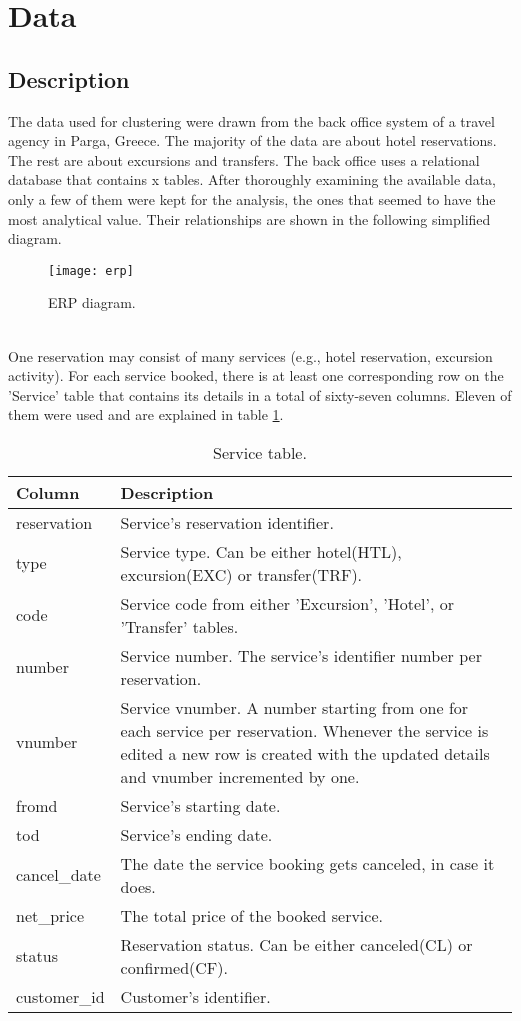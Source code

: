 \section{Data}

\subsection{Description}
The data used for clustering were drawn from the back office system of a travel agency in Parga, Greece. The majority of the data are about hotel reservations. The rest are about excursions and transfers. The back office uses a relational database that contains x tables. After thoroughly examining the available data, only a few of them were kept for the analysis, the ones that seemed to have the most analytical value. Their relationships are shown in the following simplified diagram. \\
\begin{figure}[ht]
\texttt{[image: erp]}
\caption{ERP diagram.}
\label{fig:erp}
\end{figure}
\\
One reservation may consist of many services (e.g., hotel reservation, excursion activity). For each service booked, there is at least one corresponding row on the 'Service' table that contains its details in a total of sixty-seven columns. Eleven of them were used and are explained in table \ref{tab:service}. \\
\begin{table}[h!]
\begin{center}
\begin{tabular}{l | p{12cm}}
\hline\hline
\textbf{Column} & \textbf{Description}\\
\hline\hline
reservation & Service's reservation identifier.\\
\hline
type & Service type. Can be either hotel(HTL), excursion(EXC) or transfer(TRF).\\
\hline
code & Service code from either 'Excursion', 'Hotel', or 'Transfer' tables.\\
\hline
number & Service number. The service's identifier number per reservation.\\
\hline
vnumber & Service vnumber. A number starting from one for each service per reservation. Whenever the service is edited a new row is created with the updated details and vnumber incremented by one.\\
\hline
fromd & Service's starting date.\\
\hline
tod & Service's ending date.\\
\hline
cancel\_date & The date the service booking gets canceled, in case it does.\\
\hline
net\_price & The total price of the booked service.\\
\hline
status & Reservation status. Can be either canceled(CL) or confirmed(CF). \\
\hline
customer\_id & Customer's identifier.\\
\hline\hline
\end{tabular}
\caption{Service table.}
\label{tab:service}
\end{center}
\end{table}
